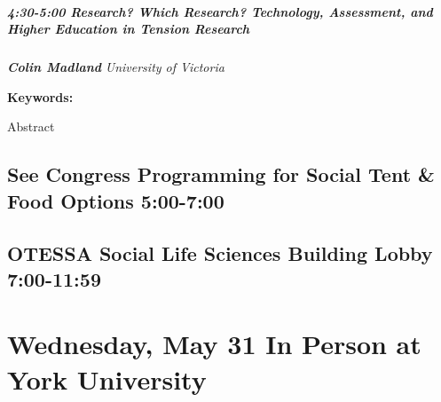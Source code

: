 \documentclass[
]{book}
\begin{document}
\begin{session}
\hypertarget{research-which-research-technology-assessment-and-higher-education-in-tension-research}{%
\paragraph*{\texorpdfstring{4:30-5:00 \textbar{} \textbf{Research? Which
Research? Technology, Assessment, and Higher Education in Tension}
\textbar{}
Research}{4:30-5:00 \textbar{} Research? Which Research? Technology, Assessment, and Higher Education in Tension \textbar{} Research}}\label{research-which-research-technology-assessment-and-higher-education-in-tension-research}}

\textbf{\emph{Colin Madland}} \textbar{} \emph{University of Victoria}

\textbf{Keywords:}

Abstract
\end{session}

\hypertarget{see-congress-programming-for-social-tent-food-options-500-700-1}{%
\section*{See Congress Programming for Social Tent \& Food Options \textbar{} 5:00-7:00}\label{see-congress-programming-for-social-tent-food-options-500-700-1}}

\hypertarget{otessa-social-life-sciences-building-lobby-700-1159-1}{%
\section*{OTESSA Social \textbar{} Life Sciences Building Lobby \textbar{} 7:00-11:59}\label{otessa-social-life-sciences-building-lobby-700-1159-1}}

\hypertarget{wednesday-may-31-in-person-at-york-university}{%
\chapter{Wednesday, May 31 \textbar{} In Person at York University}\label{wednesday-may-31-in-person-at-york-university}}
\end{document}
